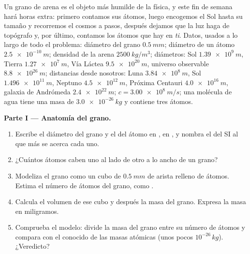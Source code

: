 \begin{problem}
\label{pb:g10:orders-of-magnitude:1}
Un grano de arena es el objeto más humilde de la física, y este fin de
semana hará horas extra: primero contamos sus átomos, luego encogemos el
Sol hasta su tamaño y recorremos el cosmos a pasos, después dejamos que
la luz haga de topógrafo y, por último, contamos los átomos que hay en
\emph{ti}. Datos, usados a lo largo de todo el problema: diámetro del
grano $\qty{0.5}{mm}$; diámetro de un átomo $\qty{2.5e-10}{m}$; densidad
de la arena $\qty{2500}{kg/m^3}$; diámetros: Sol $\qty{1.39e9}{m}$,
Tierra $\qty{1.27e7}{m}$, Vía Láctea $\qty{9.5e20}{m}$, universo
observable $\qty{8.8e26}{m}$; distancias desde nosotros: Luna
$\qty{3.84e8}{m}$, Sol $\qty{1.496e11}{m}$, Neptuno $\qty{4.5e12}{m}$,
Próxima Centauri $\qty{4.0e16}{m}$, galaxia de Andrómeda
$\qty{2.4e22}{m}$; $c = \qty{3.00e8}{m/s}$; una molécula de agua tiene
una masa de $\qty{3.0e-26}{kg}$ y contiene tres átomos.

\medskip
\noindent\textbf{Parte I --- Anatomía del grano.}
\begin{enumerate}
  \item Escribe el diámetro del grano y el del átomo en , en
        , y nombra el  del SI al que más se
        acerca cada uno.
  \item ¿Cuántos átomos caben uno al lado de otro a lo ancho de un
        grano?
  \item Modeliza el grano como un cubo de $\qty{0.5}{mm}$ de arista
        relleno de átomos. Estima el número de átomos del grano, como
        .
  \item Calcula el volumen de ese cubo y después la masa del grano.
        Expresa la masa en miligramos.
  \item Comprueba el modelo: divide la masa del grano entre su número de
        átomos y compara con el  conocido de las masas
        atómicas (unos pocos $10^{-26}\,\unit{kg}$). ¿Veredicto?
\end{enumerate}


\end{problem}
